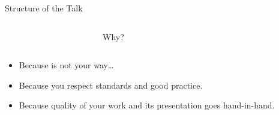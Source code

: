 \documentclass[xcolor=dvipsnames, aspectratio=169, handout, intlimits]{beamer}
\begin{document}
\begin{frame}{Structure of the Talk}

\vspace{-0.5cm}
\begin{columns}
	\begin{column}{0.25\textwidth}	
		
	\end{column}
	\begin{column}{0.5\textwidth}
		\begin{block}{}
			\centering
			Why?
		\end{block}			
	\end{column}
	\begin{column}{0.25\textwidth}
		
	\end{column}		
\end{columns}

\vspace{0.25cm}
\begin{itemize}
	\item Because  is not your way\dots
	\item Because you respect standards and good practice.
	\item Because quality of your work and its presentation goes hand-in-hand.
\end{itemize}

\vspace{0.25cm}

\end{frame}
\end{document}
